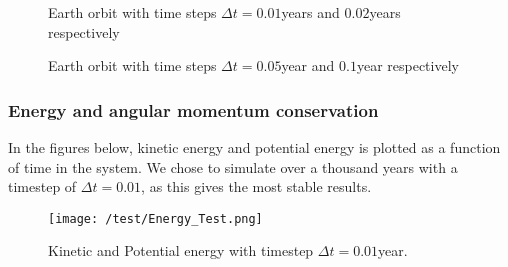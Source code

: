 \documentclass[../main.tex]{subfiles}
\begin{document}
\begin{figure}[!h]
  \centering
  \caption{Earth orbit with time steps $\Delta t = 0.01$years and $0.02$years respectively }
  \label{fig:results-Timestep1}
\end{figure}
\FloatBarrier
\begin{figure}[!h]
  \centering
  \caption{Earth orbit with time steps $\Delta t = 0.05$year and $0.1$year respectively }
  \label{fig:results-Timestep2}
\end{figure}
\FloatBarrier

\subsubsection{Energy and angular momentum conservation}\label{sec:results-test-conservation}
In the figures below, kinetic energy and potential energy is plotted as a function of time in the system. We chose to simulate over a thousand years with a timestep of $\Delta t = 0.01$, as this gives the most stable results.
\begin{figure}[!h]
  \centering
  \texttt{[image: /test/Energy\_Test.png]} %
  \caption{Kinetic and Potential energy with timestep $\Delta t = 0.01$year.}
  \label{fig:results-Energies}
\end{figure}
\FloatBarrier
\end{document}
